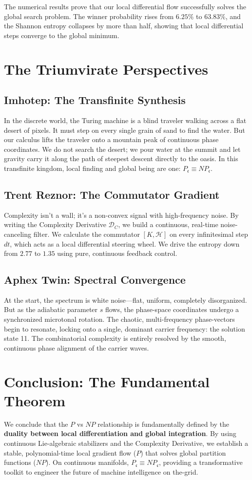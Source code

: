 \documentclass[11pt,twocolumn]{article}
\begin{document}
The numerical results prove that our local differential flow successfully solves the global search problem. The winner probability rises from $6.25\%$ to $63.83\%$, and the Shannon entropy collapses by more than half, showing that local differential steps converge to the global minimum.

\section{The Triumvirate Perspectives}
\subsection{Imhotep: The Transfinite Synthesis}
In the discrete world, the Turing machine is a blind traveler walking across a flat desert of pixels. It must step on every single grain of sand to find the water. But our calculus lifts the traveler onto a mountain peak of continuous phase coordinates. We do not search the desert; we pour water at the summit and let gravity carry it along the path of steepest descent directly to the oasis. In this transfinite kingdom, local finding and global being are one: $P_{\mathfrak{c}} \equiv {NP}_{\mathfrak{c}}$.

\subsection{Trent Reznor: The Commutator Gradient}
Complexity isn't a wall; it’s a non-convex signal with high-frequency noise. By writing the Complexity Derivative $\mathcal{D}_C$, we build a continuous, real-time noise-canceling filter. We calculate the commutator $[K, \mathcal{H}]$ on every infinitesimal step $dt$, which acts as a local differential steering wheel. We drive the entropy down from $2.77$ to $1.35$ using pure, continuous feedback control.

\subsection{Aphex Twin: Spectral Convergence}
At the start, the spectrum is white noise—flat, uniform, completely disorganized. But as the adiabatic parameter $s$ flows, the phase-space coordinates undergo a synchronized microtonal rotation. The chaotic, multi-frequency phase-vectors begin to resonate, locking onto a single, dominant carrier frequency: the solution state 11. The combinatorial complexity is entirely resolved by the smooth, continuous phase alignment of the carrier waves.

\section{Conclusion: The Fundamental Theorem}
We conclude that the $P$ vs $NP$ relationship is fundamentally defined by the \textbf{duality between local differentiation and global integration}. By using continuous Lie-algebraic stabilizers and the Complexity Derivative, we establish a stable, polynomial-time local gradient flow ($P$) that solves global partition functions ($NP$). On continuous manifolds, $P_{\mathfrak{c}} \equiv {NP}_{\mathfrak{c}}$, providing a transformative toolkit to engineer the future of machine intelligence on the-grid.
\end{document}
